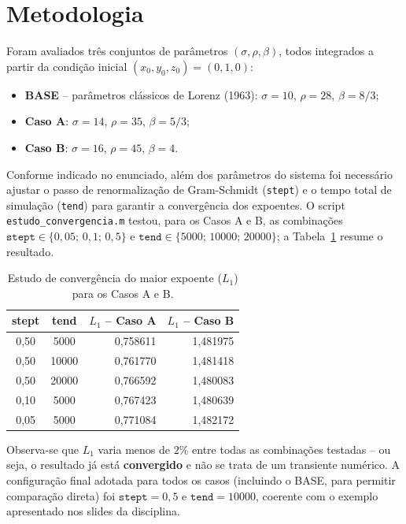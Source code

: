 \documentclass[a4paper,11pt]{article}
\begin{document}
\section{Metodologia}

Foram avaliados três conjuntos de parâmetros $(\sigma,\rho,\beta)$,
todos integrados a partir da condição inicial $(x_0,y_0,z_0)=(0,1,0)$:

\begin{itemize}
\item \textbf{BASE} -- parâmetros clássicos de Lorenz (1963):
$\sigma=10$, $\rho=28$, $\beta=8/3$;
\item \textbf{Caso A}: $\sigma=14$, $\rho=35$, $\beta=5/3$;
\item \textbf{Caso B}: $\sigma=16$, $\rho=45$, $\beta=4$.
\end{itemize}

Conforme indicado no enunciado, além dos parâmetros do sistema foi
necessário ajustar o passo de renormalização de Gram-Schmidt
(\texttt{stept}) e o tempo total de simulação (\texttt{tend}) para
garantir a convergência dos expoentes. O script
\texttt{estudo\_convergencia.m} testou, para os Casos A e B, as
combinações $\texttt{stept}\in\{0{,}05;\,0{,}1;\,0{,}5\}$ e
$\texttt{tend}\in\{5000;\,10000;\,20000\}$; a Tabela~\ref{tab:convergencia}
resume o resultado.

\begin{table}[h]
\centering
\caption{Estudo de convergência do maior expoente ($L_1$) para os Casos A e B.}
\label{tab:convergencia}
\begin{tabular}{ccrr}
\toprule
\textbf{stept} & \textbf{tend} & \textbf{$L_1$ -- Caso A} & \textbf{$L_1$ -- Caso B} \\
\midrule
0,50 & 5000  & 0,758611 & 1,481975 \\
0,50 & 10000 & 0,761770 & 1,481418 \\
0,50 & 20000 & 0,766592 & 1,480083 \\
0,10 & 5000  & 0,767423 & 1,480639 \\
0,05 & 5000  & 0,771084 & 1,482172 \\
\bottomrule
\end{tabular}
\end{table}

Observa-se que $L_1$ varia menos de $2\%$ entre todas as combinações
testadas -- ou seja, o resultado já está \textbf{convergido} e não se
trata de um transiente numérico. A configuração final adotada para
todos os casos (incluindo o BASE, para permitir comparação direta) foi
$\texttt{stept}=0{,}5$ e $\texttt{tend}=10000$, coerente com o exemplo
apresentado nos slides da disciplina.
\end{document}
